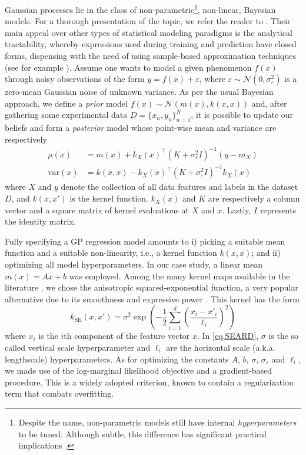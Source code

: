 Gaussian processes lie in the class of non-parametric\footnote{Despite the name, non-parametric models still have internal \textit{hyperparameters} to be tuned. Although subtle, this difference has significant practical implications \cite{williams2006gaussian}.}, non-linear, Bayesian models. For a thorough presentation of the topic, we refer the reader to \cite{williams2006gaussian,duvenaud2014automatic}. Their main appeal over other types of statistical modeling paradigms is the analytical tractability, whereby expressions used during training and prediction have closed forms, dispensing with the need of using sample-based approximation techniques (see for example \cite{chong2017comparison,chong2019continuous}). 
Assume one wants to model a given phenomenon $f(x)$ through noisy observations of the form $y = f(x) + \varepsilon$, where $\varepsilon \sim \mathcal{N}(0,\sigma^2_\varepsilon)$ is a zero-mean Gaussian noise of unknown variance. As per the usual Bayesian approach, we define a \textit{prior} model $f(x) \sim \mathcal{N}(m(x),k(x,x))$ and, after gathering some experimental data $D= \{x_n,y_n\}_{n=1}^N$, it is possible to update our beliefs and form a \textit{posterior} model whose point-wise mean and variance are respectively
\begin{subequations}
	\begin{align}
		\mu(x) &= m(x) + k_X(x)^\top (K+\sigma^2_{\varepsilon}I)^{-1}(y-m_X) \label{eq.GPmean}\\
		\text{var}(x) &= k(x,x) - k_X(x)^\top (K+\sigma^2_{\varepsilon}I)^{-1} k_X(x) \label{eq.GPvar}
	\end{align}
\end{subequations}
where $X$ and $y$ denote the collection of all data features and labels in the dataset $D$, and $k(x,x')$ is the kernel function. $k_{X}(x)$ and $K$ are respectively a column vector and a square matrix of kernel evaluations at $X$ and $x$. Lastly, $I$ represents the identity matrix.

Fully specifying a GP regression model amounts to i) picking a suitable mean function and a suitable non-linearity, i.e., a kernel function $k(x,x)$; and ii) optimizing all model hyperparameters. In our case study, a linear mean $m(x) = Ax + b$ was employed. Among the many kernel maps available in the literature \cite{duvenaud2014automatic}, we chose the anisotropic squared-exponential function, a very popular alternative due to its smoothness and expressive power \cite{lederer2021impact,van2021learning}. This kernel has the form 
\begin{equation}
	k_{\text{SE}}(x,x') = \sigma^2 \exp \left(-\frac{1}{2} \sum_{i=1}^d \left(\frac{x_i - x'_i}{\ell_i}\right)^2\right)
	\label{eq.SEARD}
\end{equation}
where $x_i$ is the $i$th component of the feature vector $x$. In \eqref{eq.SEARD}, $\sigma$ is the so called vertical scale hyperparameter and $\ell_i$ are the horizontal scale (a.k.a. lengthscale) hyperparameters. As for optimizing the constants $A$, $b$, $\sigma$, $\sigma_\varepsilon$ and $\ell_i$, we made use of the log-marginal likelihood objective \cite[Chapter 5]{williams2006gaussian} and a gradient-based procedure. This is a widely adopted criterion, known to contain a regularization term that combats overfitting.

